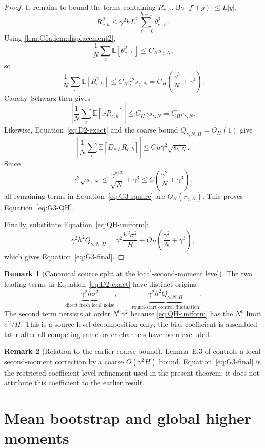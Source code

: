 \documentclass[11pt]{article}
\theoremstyle{definition}
\newtheorem{remark}[remark]{Remark}
\newcommand{\E}{\mathbb{E}}
\newcommand{\smallscale}{s_{\gamma,N}}
\newcommand{\remscale}{r_{\gamma,N}}
\newcommand{\QH}{Q_{\gamma,N,H}}
\begin{document}
\begin{proof}
It remains to bound the terms containing $R_{c,h}$. By $|f'(y)|\le L|y|$,
\[
  R_{c,h}^2\le \gamma^2hL^2\sum_{\ell=0}^{h-1}\theta_{c,\ell}^2.
\]
Using \cref{lem:G5a,lem:displacement2},
\[
  \frac1N\sum_c\E[\theta_{c,\ell}^2]\le C_H\smallscale,
\]
so
\begin{equation}
\label{eq:R2-G3}
  \frac1N\sum_c\E[R_{c,h}^2]
  \le C_H\gamma^2\smallscale
  =C_H\left(\frac{\gamma^3}{N}+\gamma^4\right).
\end{equation}
Cauchy--Schwarz then gives
\[
  \left|\frac1N\sum_c\E[xR_{c,h}]\right|
  \le C_H\gamma\smallscale=C_H\remscale.
\]
Likewise, Equation~\eqref{eq:D2-exact} and the coarse bound $\QH=O_H(1)$ give
\[
  \left|\frac1N\sum_c\E[D_{c,h}R_{c,h}]\right|
  \le C_H\gamma^2\sqrt{\smallscale}.
\]
Since
\[
  \gamma^2\sqrt{\smallscale}
  \le \frac{\gamma^{5/2}}{\sqrt N}+\gamma^3
  \le C\left(\frac{\gamma^2}{N}+\gamma^3\right),
\]
all remaining terms in Equation~\eqref{eq:G3-square} are $O_H(\remscale)$. This proves Equation~\eqref{eq:G3-QH}.

Finally, substitute Equation~\eqref{eq:QH-uniform}:
\[
  \gamma^2h^2\QH
  =\gamma^2\frac{h^2\sigma^2}{H}
   +O_H\left(\frac{\gamma^2}{N}+\gamma^3\right),
\]
which gives Equation~\eqref{eq:G3-final}.
\end{proof}

\begin{remark}[Canonical source split at the local-second-moment level]
The two leading terms in Equation~\eqref{eq:D2-exact} have distinct origins:
\[
  \underbrace{\gamma^2h\sigma^2}_{\text{direct fresh local noise}},
  \qquad
  \underbrace{\gamma^2h^2\QH}_{\text{round-start control fluctuation}}.
\]
The second term persists at order $N^0\gamma^2$ because \cref{eq:QH-uniform} has the $N^0$ limit $\sigma^2/H$. This is a source-level decomposition only; the bias coefficient is assembled later after all competing same-order channels have been excluded.
\end{remark}

\begin{remark}[Relation to the earlier coarse bound]
Lemma~E.3 of \citet{mangold2025scaffold} controls a local second-moment correction by a coarse $O(\gamma^2H)$ bound. Equation~\eqref{eq:G3-final} is the restricted coefficient-level refinement used in the present theorem; it does not attribute this coefficient to the earlier result.
\end{remark}

\section{Mean bootstrap and global higher moments}
\label{sec:mean-global}
\end{document}
